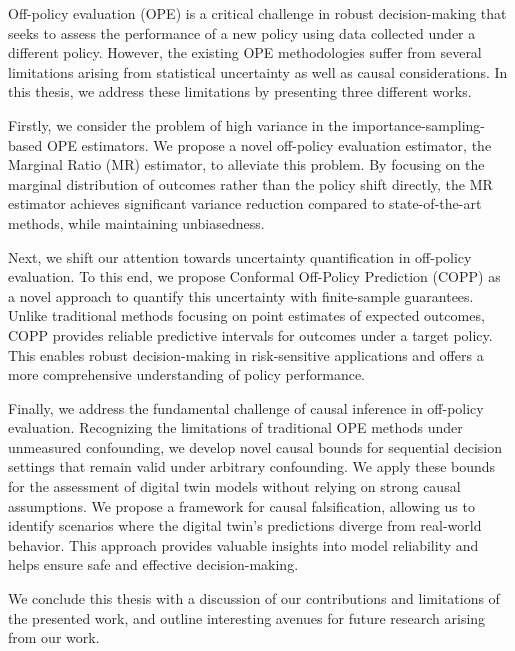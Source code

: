 Off-policy evaluation (OPE) is a critical challenge in robust decision-making that seeks to assess the performance of a new policy using data collected under a different policy. 
However, the existing OPE methodologies suffer from several limitations arising from statistical uncertainty as well as causal considerations. 
In this thesis, we address these limitations by presenting three different works. 

Firstly, we consider the problem of high variance in the importance-sampling-based OPE estimators. 
We propose a novel off-policy evaluation estimator, the Marginal Ratio (MR) estimator, to alleviate this problem.
By focusing on the marginal distribution of outcomes rather than the policy shift directly, the MR estimator achieves significant variance reduction compared to state-of-the-art methods, while maintaining unbiasedness. 

Next, we shift our attention towards uncertainty quantification in off-policy evaluation.
To this end, we propose Conformal Off-Policy Prediction (COPP) as a novel approach to quantify this uncertainty with finite-sample guarantees.
Unlike traditional methods focusing on point estimates of expected outcomes, COPP provides reliable predictive intervals for outcomes under a target policy. This enables robust decision-making in risk-sensitive applications and offers a more comprehensive understanding of policy performance. 

Finally, we address the fundamental challenge of causal inference in off-policy evaluation. 
Recognizing the limitations of traditional OPE methods under unmeasured confounding, we develop novel causal bounds for sequential decision settings that remain valid under arbitrary confounding.
We apply these bounds for the assessment of digital twin models without relying on strong causal assumptions. 
We propose a framework for causal falsification, allowing us to identify scenarios where the digital twin's predictions diverge from real-world behavior. This approach provides valuable insights into model reliability and helps ensure safe and effective decision-making.

We conclude this thesis with a discussion of our contributions and
limitations of the presented work, and outline interesting avenues for future research arising from our work.